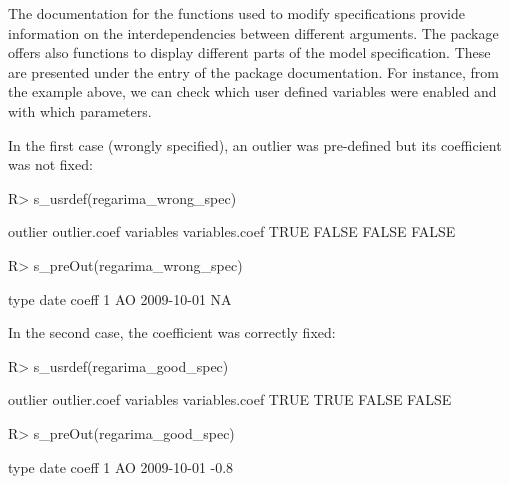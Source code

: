 \documentclass[article]{jss}
\begin{document}
The documentation for the functions used to modify specifications
provide information on the interdependencies between different
arguments. The package offers also functions to display different parts
of the model specification. These are presented under the entry
 of the package documentation. For instance, from
the example above, we can check which user defined variables were
enabled and with which parameters.

In the first case (wrongly specified), an outlier was pre-defined but
its coefficient was not fixed:

\begin{CodeChunk}

\begin{CodeInput}
R> s_usrdef(regarima_wrong_spec)
\end{CodeInput}

\begin{CodeOutput}
 outlier outlier.coef variables variables.coef
    TRUE        FALSE     FALSE          FALSE
\end{CodeOutput}

\begin{CodeInput}
R> s_preOut(regarima_wrong_spec)
\end{CodeInput}

\begin{CodeOutput}
  type       date coeff
1   AO 2009-10-01    NA
\end{CodeOutput}
\end{CodeChunk}

In the second case, the coefficient was correctly fixed:

\begin{CodeChunk}

\begin{CodeInput}
R> s_usrdef(regarima_good_spec)
\end{CodeInput}

\begin{CodeOutput}
 outlier outlier.coef variables variables.coef
    TRUE         TRUE     FALSE          FALSE
\end{CodeOutput}

\begin{CodeInput}
R> s_preOut(regarima_good_spec)
\end{CodeInput}

\begin{CodeOutput}
  type       date coeff
1   AO 2009-10-01  -0.8
\end{CodeOutput}
\end{CodeChunk}
\end{document}
